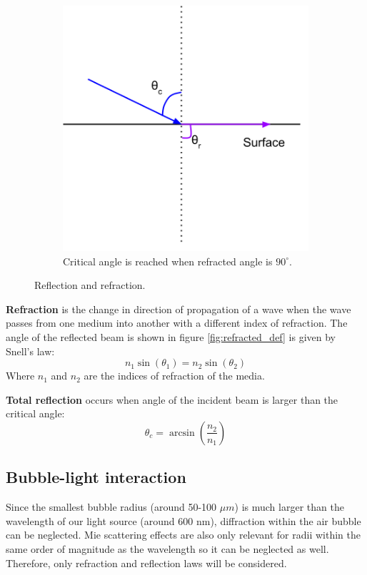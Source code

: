 \begin{figure}
		    \begin{subfigure}[t]{0.5\textwidth}
		        \includegraphics[width=\textwidth]{images/total_reflection.png}
		        \caption{Critical angle is reached when refracted angle is $90^\circ$.}
		        \label{fig:total_reflected_def}
		    \end{subfigure}
		    \caption{Reflection and refraction.}
	 		\end{figure}	
			
			\textbf{Refraction} is the change in direction of propagation of a wave when the wave passes from one medium into another with a different index of refraction. The angle of the reflected beam is shown in figure \ref{fig:refracted_def} is given by Snell's law:
			\begin{equation}
				n_1 \sin(\theta_1) = n_2 \sin(\theta_2)
			\end{equation}
				Where $n_1$ and $n_2$ are the indices of refraction of the media.
				
				\textbf{Total reflection} occurs when angle of the incident beam is larger than the critical angle:
				\begin{equation}
					\theta_c = \arcsin\left(\dfrac{n_2}{n_1}\right)
				\end{equation}
				
				
		\subsection{Bubble-light interaction}
			Since the smallest bubble radius (around 50-100 $\mu m$) is much larger than the wavelength of our light source (around 600 nm), diffraction within the air bubble can be neglected. Mie scattering effects are also only relevant for radii within the same order of magnitude as the wavelength \citep{Demtroeder2} so it can be neglected as well. Therefore, only refraction and reflection laws will be considered. 
			
